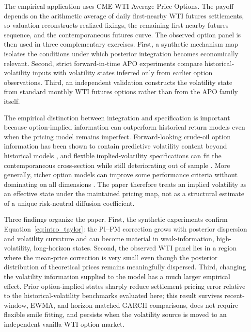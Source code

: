 The empirical application uses CME WTI Average Price Options. The payoff depends on the arithmetic average of daily first-nearby WTI futures settlements, so valuation reconstructs realized fixings, the remaining first-nearby futures sequence, and the contemporaneous futures curve. The observed option panel is then used in three complementary exercises. First, a synthetic mechanism map isolates the conditions under which posterior integration becomes economically relevant. Second, strict forward-in-time APO experiments compare historical-volatility inputs with volatility states inferred only from earlier option observations. Third, an independent validation constructs the volatility state from standard monthly WTI futures options rather than from the APO family itself.

The empirical distinction between integration and specification is important because option-implied information can outperform historical return models even when the pricing model remains imperfect. Forward-looking crude-oil option information has been shown to contain predictive volatility content beyond historical models \cite{gildertsiaras2020}, and flexible implied-volatility specifications can fit the contemporaneous cross-section while still deteriorating out of sample \cite{dumasflemingwhaley1998}. More generally, richer option models can improve some performance criteria without dominating on all dimensions \cite{bakshicaochen1997,cumminsesposito2025}. The paper therefore treats an implied volatility as an effective state under the maintained pricing map, not as a structural estimate of a unique risk-neutral diffusion coefficient.

Three findings organize the paper. First, the synthetic experiments confirm Equation~\eqref{eq:intro_taylor}: the PI--PM correction grows with posterior dispersion and volatility curvature and can become material in weak-information, high-volatility, long-horizon states. Second, the observed WTI panel lies in a region where the mean-price correction is very small even though the posterior distribution of theoretical prices remains meaningfully dispersed. Third, changing the volatility information supplied to the model has a much larger empirical effect. Prior option-implied states sharply reduce settlement pricing error relative to the historical-volatility benchmarks evaluated here; this result survives recent-window, EWMA, and horizon-matched GARCH comparisons, does not require flexible smile fitting, and persists when the volatility source is moved to an independent vanilla-WTI option market.

